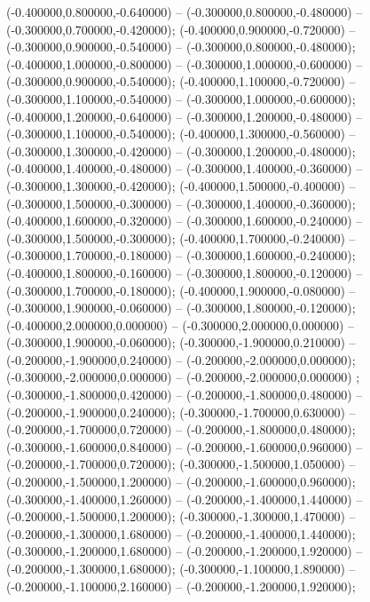  (-0.400000,0.800000,-0.640000) -- (-0.300000,0.800000,-0.480000) -- (-0.300000,0.700000,-0.420000);
 (-0.400000,0.900000,-0.720000) -- (-0.300000,0.900000,-0.540000) -- (-0.300000,0.800000,-0.480000);
 (-0.400000,1.000000,-0.800000) -- (-0.300000,1.000000,-0.600000) -- (-0.300000,0.900000,-0.540000);
 (-0.400000,1.100000,-0.720000) -- (-0.300000,1.100000,-0.540000) -- (-0.300000,1.000000,-0.600000);
 (-0.400000,1.200000,-0.640000) -- (-0.300000,1.200000,-0.480000) -- (-0.300000,1.100000,-0.540000);
 (-0.400000,1.300000,-0.560000) -- (-0.300000,1.300000,-0.420000) -- (-0.300000,1.200000,-0.480000);
 (-0.400000,1.400000,-0.480000) -- (-0.300000,1.400000,-0.360000) -- (-0.300000,1.300000,-0.420000);
 (-0.400000,1.500000,-0.400000) -- (-0.300000,1.500000,-0.300000) -- (-0.300000,1.400000,-0.360000);
 (-0.400000,1.600000,-0.320000) -- (-0.300000,1.600000,-0.240000) -- (-0.300000,1.500000,-0.300000);
 (-0.400000,1.700000,-0.240000) -- (-0.300000,1.700000,-0.180000) -- (-0.300000,1.600000,-0.240000);
 (-0.400000,1.800000,-0.160000) -- (-0.300000,1.800000,-0.120000) -- (-0.300000,1.700000,-0.180000);
 (-0.400000,1.900000,-0.080000) -- (-0.300000,1.900000,-0.060000) -- (-0.300000,1.800000,-0.120000);
 (-0.400000,2.000000,0.000000) -- (-0.300000,2.000000,0.000000) -- (-0.300000,1.900000,-0.060000);
 (-0.300000,-1.900000,0.210000) -- (-0.200000,-1.900000,0.240000) -- (-0.200000,-2.000000,0.000000);
 (-0.300000,-2.000000,0.000000) -- (-0.200000,-2.000000,0.000000) ;
 (-0.300000,-1.800000,0.420000) -- (-0.200000,-1.800000,0.480000) -- (-0.200000,-1.900000,0.240000);
 (-0.300000,-1.700000,0.630000) -- (-0.200000,-1.700000,0.720000) -- (-0.200000,-1.800000,0.480000);
 (-0.300000,-1.600000,0.840000) -- (-0.200000,-1.600000,0.960000) -- (-0.200000,-1.700000,0.720000);
 (-0.300000,-1.500000,1.050000) -- (-0.200000,-1.500000,1.200000) -- (-0.200000,-1.600000,0.960000);
 (-0.300000,-1.400000,1.260000) -- (-0.200000,-1.400000,1.440000) -- (-0.200000,-1.500000,1.200000);
 (-0.300000,-1.300000,1.470000) -- (-0.200000,-1.300000,1.680000) -- (-0.200000,-1.400000,1.440000);
 (-0.300000,-1.200000,1.680000) -- (-0.200000,-1.200000,1.920000) -- (-0.200000,-1.300000,1.680000);
 (-0.300000,-1.100000,1.890000) -- (-0.200000,-1.100000,2.160000) -- (-0.200000,-1.200000,1.920000);

